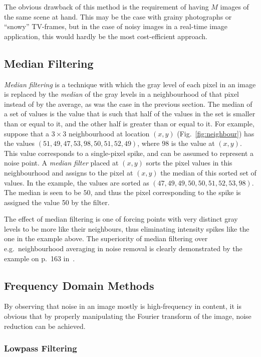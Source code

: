 The obvious drawback of this method is the requirement of having $M$
images of the same scene at hand.  This may be the case with grainy
photographs or ``snowy'' TV-frames, but in the case of noisy images in
a real-time image application, this would hardly be the most
cost-efficient approach.

\subsection{Median Filtering}
\label{image:noise:median}

{\em Median filtering\/} is a technique with which the gray level of
each pixel in an image is replaced by the {\em median\/} of the gray
levels in a neighbourhood of that pixel instead of by the average, as
was the case in the previous section.  The median of a set of values
is the value that is such that half of the values in the set is
smaller than or equal to it, and the other half is greater than or
equal to it.  For example, suppose that a $3\times 3$ neighbourhood at
location $(x,y)$ (Fig.~\ref{fig:neighbour}) has the values
$(51,49,47,53,98,50,51,52,49)$, where $98$ is the value at $(x,y)$.
This value corresponds to a single-pixel spike, and can be assumed to
represent a noise point.  A {\em median filter\/} placed at $(x,y)$
sorts the pixel values in this neighbourhood and assigns to the pixel
at $(x,y)$ the median of this sorted set of values.  In the example,
the values are sorted as $(47,49,49,50,50,51,52,53,98)$.  The median
is seen to be $50$, and thus the pixel corresponding to the spike is
assigned the value 50 by the filter.

The effect of median filtering is one of forcing points with very
distinct gray levels to be more like their neighbours, thus
eliminating intensity spikes like the one in the example above.  The
superiority of median filtering over e.g.\ neighbourhood averaging in
noise removal is clearly demonstrated by the example on p.\ 163
in~\cite{digim}.

\subsection{Frequency Domain Methods}
\label{image:noise:frequency}

By observing that noise in an image mostly is high-frequency in
content, it is obvious that by properly manipulating the Fourier
transform of the image, noise reduction can be achieved.

\subsubsection{Lowpass Filtering}

